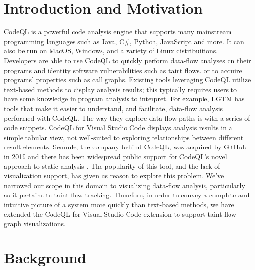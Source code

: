 \documentclass[sigplan,10pt,review]{acmart}
\begin{document}
\section{Introduction and Motivation}
CodeQL is a powerful code analysis engine that supports many mainstream programming languages such as Java, C\#, Python, JavaScript and more. It can also be run on MacOS, Windows, and a variety of Linux distribuitions. Developers are able to use CodeQL to quickly perform data-flow analyses on their programs and identity software vulnerabilities such as taint flows, or to acquire programs' properties such as call graphs.
\newline
\indent Existing tools leveraging CodeQL utilize text-based methods to display analysis results; this typically requires users to have some knowledge in program analysis to interpret. For example, LGTM has tools that make it easier to understand, and facilitate, data-flow analysis performed with CodeQL. The way they explore data-flow paths is with a series of code snippets. CodeQL for Visual Studio Code displays analysis results in a simple tabular view, not well-suited to exploring relationships between different result elements.
\newline
\indent Semmle, the company behind CodeQL, was acquired by GitHub in 2019 and there has been widespread public support for CodeQL's novel approach to static analysis \cite{Semmle_GitHub}. The popularity of this tool, and the lack of visualization support, has given us reason to explore this problem. We've narrowed our scope in this domain to visualizing data-flow analysis, particularly as it pertains to taint-flow tracking.
\newline
\indent Therefore, in order to convey a complete and intuitive picture of a system more quickly than text-based methods, we have extended the CodeQL for Visual Studio Code extension to support taint-flow graph visualizations.

\section{Background}
\end{document}
